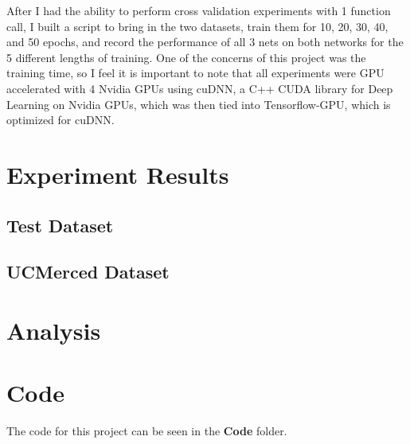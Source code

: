 \documentclass[12pt]{article}
\begin{document}
After I had the ability to perform cross validation experiments with 1 function call, I built a script to bring in the two datasets, train them for 10, 20, 30, 40, and 50 epochs, and record the performance of all 3 nets on both networks for the 5 different lengths of training. One of the concerns of this project was the training time, so I feel it is important to note that all experiments were GPU accelerated with 4 Nvidia GPUs using cuDNN, a C++ CUDA library for Deep Learning on Nvidia GPUs, which was then tied into Tensorflow-GPU, which is optimized for cuDNN. 
	
	\section{Experiment Results}
	
	\subsection{Test Dataset}
	\subsection{UCMerced Dataset}
	
	\section{Analysis}
	
	\section{Code}
	
	The code for this project can be seen in the \textbf{Code} folder. 
	
	
	\newpage
	 
	
\end{document}
